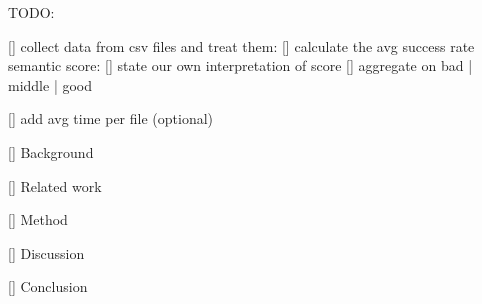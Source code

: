 TODO:

[] collect data from csv files and treat them:
    [] calculate the avg success rate
    semantic score:
    [] state our own interpretation of score
    [] aggregate on bad | middle | good
    
[] add avg time per file (optional)

[] Background

[] Related work

[] Method

[] Discussion

[] Conclusion